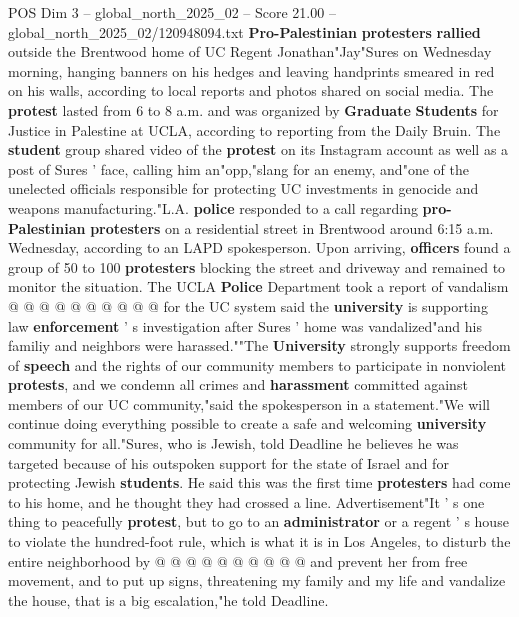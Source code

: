 \begin{textsample}{POS Dim 3 – global\_north\_2025\_02 – Score 21.00 – global\_north\_2025\_02/120948094.txt}  \label{ex:f3_pos_290}
\textbf{Pro-Palestinian} \textbf{protesters} \textbf{rallied} outside the Brentwood home of UC Regent Jonathan"Jay"Sures on Wednesday morning, hanging banners on his hedges and leaving handprints smeared in red on his walls, according to local reports and photos shared on social media.
The \textbf{protest} lasted from 6 to 8 a.m. and was organized by \textbf{Graduate} \textbf{Students} for Justice in Palestine at UCLA, according to reporting from the Daily Bruin.
The \textbf{student} group shared video of the \textbf{protest} on its Instagram account as well as a post of Sures ' face, calling him an"opp,"slang for an enemy, and"one of the unelected officials responsible for protecting UC investments in genocide and weapons manufacturing."L.A. \textbf{police} responded to a call regarding \textbf{pro-Palestinian} \textbf{protesters} on a residential street in Brentwood around 6:15 a.m.
Wednesday, according to an LAPD spokesperson.
Upon arriving, \textbf{officers} found a group of 50 to 100 \textbf{protesters} blocking the street and driveway and remained to monitor the situation.
The UCLA \textbf{Police} Department took a report of vandalism @ @ @ @ @ @ @ @ @ @ for the UC system said the \textbf{university} is supporting law \textbf{enforcement} ' s investigation after Sures ' home was vandalized"and his familiy and neighbors were harassed.""The \textbf{University} strongly supports freedom of \textbf{speech} and the rights of our community members to participate in nonviolent \textbf{protests}, and we condemn all crimes and \textbf{harassment} committed against members of our UC community,"said the spokesperson in a statement."We will continue doing everything possible to create a safe and welcoming \textbf{university} community for all."Sures, who is Jewish, told Deadline he believes he was targeted because of his outspoken support for the state of Israel and for protecting Jewish \textbf{students}.
He said this was the first time \textbf{protesters} had come to his home, and he thought they had crossed a line.
Advertisement"It ' s one thing to peacefully \textbf{protest}, but to go to an \textbf{administrator} or a regent ' s house to violate the hundred-foot rule, which is what it is in Los Angeles, to disturb the entire neighborhood by @ @ @ @ @ @ @ @ @ @ and prevent her from free movement, and to put up signs, threatening my family and my life and vandalize the house, that is a big escalation,"he told Deadline.

\end{textsample}
